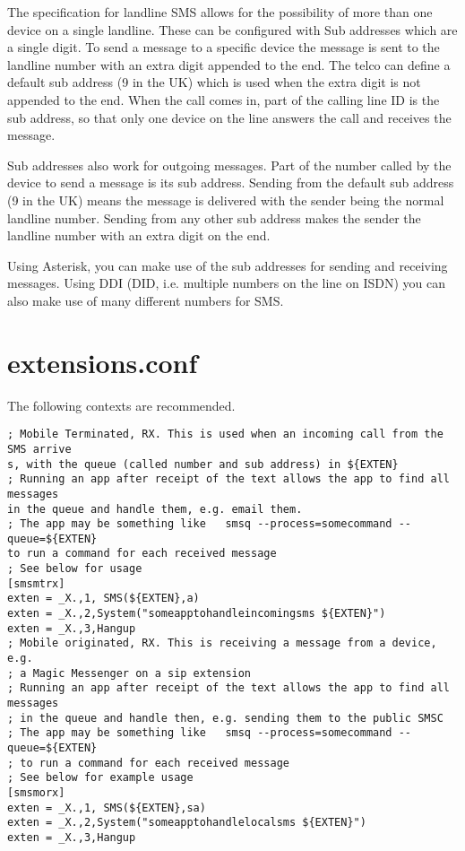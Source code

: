    The specification for landline SMS allows for the possibility of more
   than one device on a single landline. These can be configured with Sub
   addresses which are a single digit. To send a message to a specific
   device the message is sent to the landline number with an extra digit
   appended to the end. The telco can define a default sub address (9 in
   the UK) which is used when the extra digit is not appended to the end.
   When the call comes in, part of the calling line ID is the sub
   address, so that only one device on the line answers the call and
   receives the message.

   Sub addresses also work for outgoing messages. Part of the number
   called by the device to send a message is its sub address. Sending
   from the default sub address (9 in the UK) means the message is
   delivered with the sender being the normal landline number. Sending
   from any other sub address makes the sender the landline number with
   an extra digit on the end.

   Using Asterisk, you can make use of the sub addresses for sending and
   receiving messages. Using DDI (DID, i.e. multiple numbers on the line
   on ISDN) you can also make use of many different numbers for SMS.

\section{extensions.conf}

   The following contexts are recommended.

\begin{astlisting}
\begin{verbatim}
; Mobile Terminated, RX. This is used when an incoming call from the SMS arrive
s, with the queue (called number and sub address) in ${EXTEN}
; Running an app after receipt of the text allows the app to find all messages
in the queue and handle them, e.g. email them.
; The app may be something like   smsq --process=somecommand --queue=${EXTEN}
to run a command for each received message
; See below for usage
[smsmtrx]
exten = _X.,1, SMS(${EXTEN},a)
exten = _X.,2,System("someapptohandleincomingsms ${EXTEN}")
exten = _X.,3,Hangup
; Mobile originated, RX. This is receiving a message from a device, e.g.
; a Magic Messenger on a sip extension
; Running an app after receipt of the text allows the app to find all messages
; in the queue and handle then, e.g. sending them to the public SMSC
; The app may be something like   smsq --process=somecommand --queue=${EXTEN}
; to run a command for each received message
; See below for example usage
[smsmorx]
exten = _X.,1, SMS(${EXTEN},sa)
exten = _X.,2,System("someapptohandlelocalsms ${EXTEN}")
exten = _X.,3,Hangup
\end{verbatim}
\end{astlisting}

